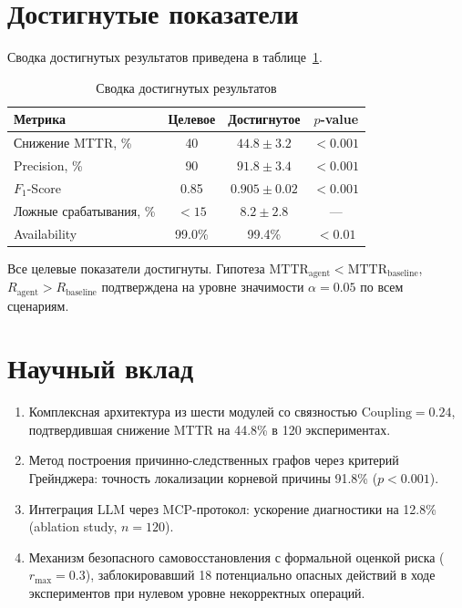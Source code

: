 \section*{Достигнутые показатели}

Сводка достигнутых результатов приведена в таблице~\ref{tab:results_summary}.

\begin{table}[H]
\centering
\caption{Сводка достигнутых результатов}
\label{tab:results_summary}
\begin{tabular}{|l|c|c|c|}
\hline
\textbf{Метрика} & \textbf{Целевое} & \textbf{Достигнутое} & \textbf{$p$-value} \\
\hline
Снижение MTTR, \% & 40 & $44.8 \pm 3.2$ & $< 0.001$ \\
\hline
Precision, \% & 90 & $91.8 \pm 3.4$ & $< 0.001$ \\
\hline
$F_1$-Score & 0.85 & $0.905 \pm 0.02$ & $< 0.001$ \\
\hline
Ложные срабатывания, \% & $< 15$ & $8.2 \pm 2.8$ & --- \\
\hline
Availability & 99.0\% & 99.4\% & $< 0.01$ \\
\hline
\end{tabular}
\end{table}

Все целевые показатели достигнуты. Гипотеза $\text{MTTR}_{\text{agent}} < \text{MTTR}_{\text{baseline}}$, $R_{\text{agent}} > R_{\text{baseline}}$ подтверждена на уровне значимости $\alpha = 0.05$ по всем сценариям.

\section*{Научный вклад}

\begin{enumerate}
    \item Комплексная архитектура из шести модулей со связностью $\text{Coupling} = 0.24$, подтвердившая снижение MTTR на 44.8\% в 120 экспериментах.
    \item Метод построения причинно-следственных графов через критерий Грейнджера: точность локализации корневой причины 91.8\% ($p < 0.001$).
    \item Интеграция LLM через MCP-протокол: ускорение диагностики на 12.8\% (ablation study, $n = 120$).
    \item Механизм безопасного самовосстановления с формальной оценкой риска ($r_{\max} = 0.3$), заблокировавший 18 потенциально опасных действий в ходе экспериментов при нулевом уровне некорректных операций.
\end{enumerate}

